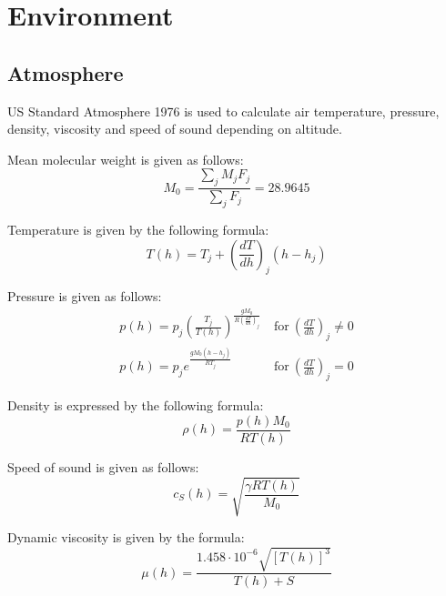 \chapter{Environment}

\section{Atmosphere}

US Standard Atmosphere 1976 is used to calculate air temperature, pressure, density, viscosity and speed of sound depending on altitude.

Mean molecular weight is given as follows:
\begin{equation}
  M_0 = \frac{ \sum_{j} M_j F_j }{ \sum_{j} F_j } = 28.9645
\end{equation}

Temperature is given by the following formula: \cite{NASA-TM-X-74335}
\begin{equation}
  T \left( h \right)
  =
  T_j + \left( \frac{dT}{dh} \right)_j \left( h - h_j \right)
\end{equation}

Pressure is given as follows: \cite{NASA-TM-X-74335}
\begin{align}
  p \left( h \right)
  =
  p_j \left( \frac{T_j}{ T \left( h \right) } \right)
  ^
  { \frac{gM_0}{ R \left( \frac{dT}{dh} \right)_j } }
  &\mathrm{~for~} \left( \frac{dT}{dh} \right)_j \neq 0 \\
    p \left( h \right)
  =
  p_j e^{ \frac{ g M_0 \left( h - h_j \right) }{RT_j} }
  &\mathrm{~for~} \left( \frac{dT}{dh} \right)_j = 0
\end{align}

Density is expressed by the following formula: \cite{NASA-TM-X-74335}
\begin{equation}
  \rho \left( h \right)
  =
  \frac{ p \left( h \right) M_0 }{ RT \left( h \right) }
\end{equation}

Speed of sound is given as follows: \cite{NASA-TM-X-74335}
\begin{equation}
  c_S \left( h \right)
  =
  \sqrt{ \frac{ \gamma RT \left( h \right) }{ M_0 } }
\end{equation}

Dynamic viscosity is given by the formula: \cite{NASA-TM-X-74335}
\begin{equation}
  \mu \left( h \right)
  =
  \frac{ 1.458 \cdot 10^{-6} \sqrt{ \left[ T \left( h \right) \right]^3 } }
  { T \left( h \right) + S }
\end{equation}

